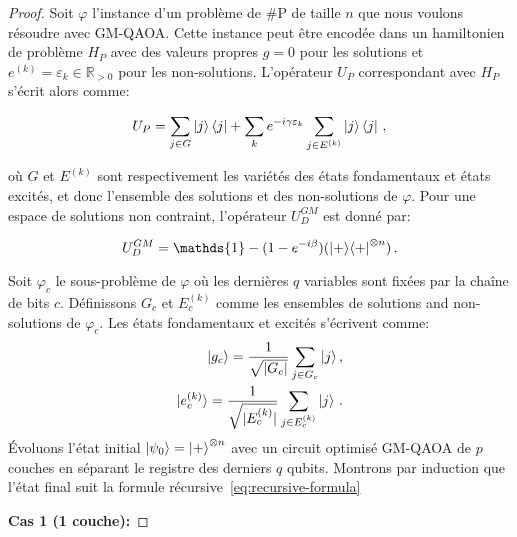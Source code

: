 \begin{proof}
    
Soit $\varphi$ l'instance d'un problème de \textsf{\#P} de taille $n$ que nous voulons résoudre avec GM-QAOA. Cette instance peut être encodée dans un hamiltonien de problème $H_{P}$ avec des valeurs propres $g = 0$ pour les solutions et $e^{(k)} = \varepsilon_{k} \in \mathbb{R}_{>0}$ pour les non-solutions. L'opérateur $U_{P}$ correspondant avec $H_{P}$ s'écrit alors comme:

\begin{equation}
    U_{P} = \sum_{j \in G} \ket{j}\bra{j} + \sum_{k} e^{-i \gamma \varepsilon_{k}} \sum_{j \in E^{(k)}} \ket{j}\bra{j} \,,
\end{equation} 

où $G$ et $E^{(k)}$ sont respectivement les variétés des états fondamentaux et états excités, et donc l'ensemble des solutions et des non-solutions de $\varphi$. Pour une espace de solutions non contraint, l'opérateur $U_{D}^{GM}$ est donné par:

\begin{equation}
    U_{D}^{GM} = \mathds{1} - (1 - e^{-i\beta}) (\ket{+}\!\bra{+}^{\otimes n}) \,.
\end{equation}

Soit $\varphi_{c}$ le sous-problème de $\varphi$ où les dernières $q$ variables sont fixées par la chaîne de bits $c$. Définissons $G_{c}$ et $E_{c}^{(k)}$ comme les ensembles de solutions and non-solutions de $\varphi_{c}$. Les états fondamentaux et excités s'écrivent comme:
\begin{align}
    \ket{g_{c}} = \frac{1}{\sqrt{ \lvert G_{c} \rvert }} \sum_{j \in G_{c}} \ket{j}, \\
    \ket{e^{(k)}_{c}} = \frac{1}{\sqrt{ \lvert E^{(k)}_{c} \rvert }} \sum_{j \in E^{(k)}_{c}} \ket{j} \,.
\end{align}
Évoluons l'état initial $\ket{\psi_{0}} = \ket{+}^{\otimes n}$ avec un circuit optimisé GM-QAOA de $p$ couches en séparant le registre des derniers $q$ qubits. Montrons par induction que l'état final suit la formule récursive~\ref{eq:recursive-formula}

\newpage
\textbf{Cas 1 (1 couche):}


\end{proof}
